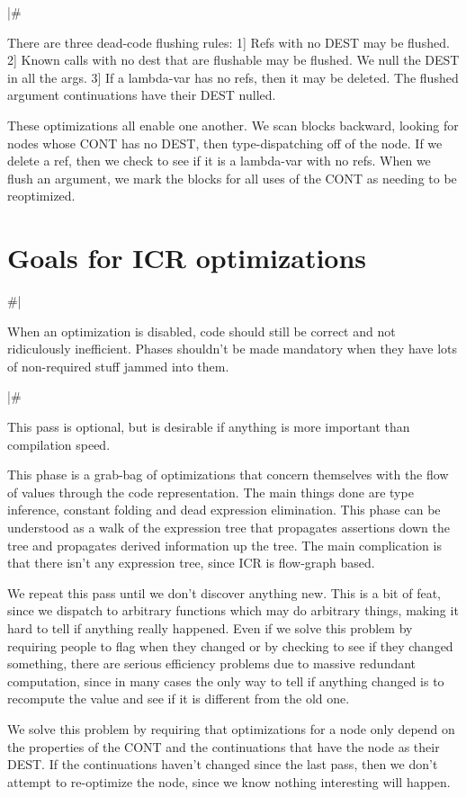 |\#

There are three dead-code flushing rules:
 1] Refs with no DEST may be flushed.
 2] Known calls with no dest that are flushable may be flushed.  We null the
    DEST in all the args.
 3] If a lambda-var has no refs, then it may be deleted.  The flushed argument
    continuations have their DEST nulled.

These optimizations all enable one another.  We scan blocks backward, looking
for nodes whose CONT has no DEST, then type-dispatching off of the node.  If we
delete a ref, then we check to see if it is a lambda-var with no refs.  When we
flush an argument, we mark the blocks for all uses of the CONT as needing to be
reoptimized.


\section{Goals for ICR optimizations}

\#|

When an optimization is disabled, code should still be correct and not
ridiculously inefficient.  Phases shouldn't be made mandatory when they have
lots of non-required stuff jammed into them.

|\#

This pass is optional, but is desirable if anything is more important than
compilation speed.

This phase is a grab-bag of optimizations that concern themselves with the flow
of values through the code representation.  The main things done are type
inference, constant folding and dead expression elimination.  This phase can be
understood as a walk of the expression tree that propagates assertions down the
tree and propagates derived information up the tree.  The main complication is
that there isn't any expression tree, since ICR is flow-graph based.

We repeat this pass until we don't discover anything new.  This is a bit of
feat, since we dispatch to arbitrary functions which may do arbitrary things,
making it hard to tell if anything really happened.  Even if we solve this
problem by requiring people to flag when they changed or by checking to see if
they changed something, there are serious efficiency problems due to massive
redundant computation, since in many cases the only way to tell if anything
changed is to recompute the value and see if it is different from the old one.

We solve this problem by requiring that optimizations for a node only depend on
the properties of the CONT and the continuations that have the node as their
DEST.  If the continuations haven't changed since the last pass, then we don't
attempt to re-optimize the node, since we know nothing interesting will happen.

